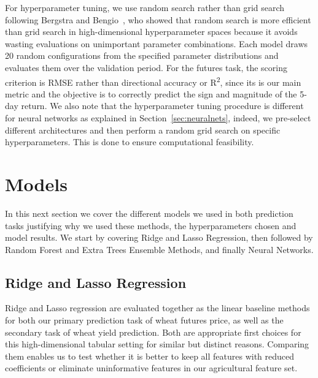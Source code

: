 \documentclass[pdflatex,sn-mathphys-num, oneside, 11pt]{sn-jnl}%
\theoremstyle{thmstyleone}%
\theoremstyle{thmstyletwo}%
\theoremstyle{thmstylethree}%
\begin{document}
For hyperparameter tuning, we use random search rather than grid search 
following Bergstra and Bengio~\cite{bib33}, who showed that random search 
is more efficient than grid search in high-dimensional hyperparameter 
spaces because it avoids wasting evaluations on unimportant parameter 
combinations. Each model draws 20 random configurations from the specified 
parameter distributions and evaluates them over the validation period. 
For the futures task, the scoring criterion is RMSE rather than directional accuracy 
or R\textsuperscript{2}, since its is our main metric and the objective 
is to correctly predict the sign and magnitude of the 5-day return. We also note that
the hyperparameter tuning procedure is different for neural networks as explained
in Section~\ref{sec:neuralnets}, indeed, we pre-select different architectures and then
perform a random grid search on specific hyperparameters. This is done to ensure 
computational feasibility.\\

\section{Models}\label{sec:models}

In this next section we cover the different models we used in both prediction 
tasks justifying why we used these methods, the hyperparameters chosen and model 
results. We start by covering Ridge and Lasso Regression, then followed by 
Random Forest and Extra Trees Ensemble Methods, and finally Neural Networks.  

\subsection{Ridge and Lasso Regression}\label{sec:ridge_lasso}

Ridge and Lasso regression are evaluated together as the linear baseline methods for both our primary prediction task of wheat futures price, as well as the secondary task of wheat yield prediction. Both are appropriate first choices for this high-dimensional tabular setting for similar but distinct reasons. Comparing them enables us to test whether it is better to keep all features with reduced coefficients or eliminate uninformative features in our agricultural feature set.\\
\end{document}
